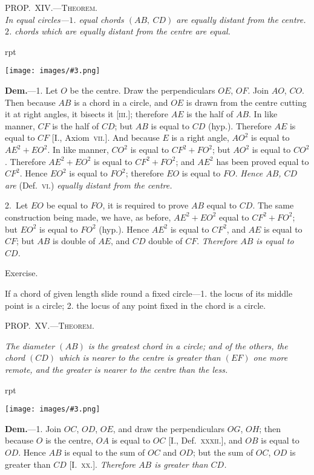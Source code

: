 \documentclass[oneside]{book}
\newcounter{wrapwidth}
\newcommand\myprop[2]{
\bigskip\Needspace*{4\baselineskip}\begin{center}\textsc{#1}\\\medskip\emph{#2}\par\end{center}
}
\newcommand\mypropl[2]{
\bigskip\Needspace*{4\baselineskip}\begin{center}\textsc{#1}\end{center}
\hspace{\parindent}\emph{#2}\par\medskip
}
\newcommand\exhead[1]{
\Needspace*{5\baselineskip}\begin{center}
\textsf{#1}
\end{center}
}
\newcommand\imgflow[3]{
\setcounter{wrapwidth}{#1}
\begin{wrapfigure}[#2]{r}{\value{wrapwidth}pt}
\begin{center}
\vspace{-0.3in}
\texttt{[image: images/\#3.png]}
\end{center}
\end{wrapfigure}
}
\begin{document}
\myprop{PROP\@.~XIV\@.---Theorem.}{In equal circles---$1$. equal chords $(AB,\ CD)$ are equally
distant from the centre. $2$. chords which are equally
distant from the centre are equal.}

\imgflow{108}{10}{f119}

\textbf{Dem.}---1. Let $O$ be the centre. Draw the perpendiculars
$OE$, $OF$. Join $AO$, $CO$.
Then because $AB$ is a chord in a
circle, and $OE$ is drawn from the
centre cutting it at right angles,
it bisects it [\textsc{iii.}]; therefore $AE$
is the half of $AB$. In like manner,
$CF$ is the half of $CD$; but $AB$
is equal to $CD$ (hyp.). Therefore
$AE$ is equal to $CF$ [I., Axiom~\textsc{vii.}].
And because $E$ is a right angle, $AO^{2}$ is equal to $AE^{2}
+ EO^{2}$. In like manner, $CO^{2}$ is equal to $CF^{2} + FO^{2}$;
but $AO^{2}$ is equal to $CO^{2}$. Therefore $AE^{2} + EO^{2}$ is
equal to $CF^{2} + FO^{2}$; and $AE^{2}$ has been proved equal to
$CF^{2}$. Hence $EO^{2}$ is equal to $FO^{2}$; therefore $EO$ is
equal to $FO$. \textit{Hence $AB$, $CD$ are} (Def.~\textsc{vi.}) \textit{equally
distant from the centre.}

2.~Let $EO$ be equal to $FO$, it is required to prove $AB$
equal to $CD$. The same construction being made, we
have, as before, $AE^{2} + EO^{2}$ equal to $CF^{2} + FO^{2}$; but $EO^{2}$
is equal to $FO^{2}$ (hyp.). Hence $AE^{2}$ is equal to $CF^{2}$,
and $AE$ is equal to $CF$; but $AB$ is double of $AE$, and
$CD$ double of $CF$. \emph{Therefore $AB$ is equal to $CD$.}

\exhead{Exercise.}

\begin{footnotesize}
If a chord of given length slide round a fixed circle---1. the
locus of its middle point is a circle; 2. the locus of any point
fixed in the chord is a circle.
\par\end{footnotesize}

\mypropl{PROP\@.~XV\@.---Theorem.}{The diameter $(AB)$ is the greatest chord in a circle;
and of the others, the chord $(CD)$ which is nearer to
the centre is greater than $(EF)$ one more remote, and
the greater is nearer to the centre than the less.}

\imgflow{120}{9}{f120}

\textbf{Dem.}---1. Join $OC$, $OD$, $OE$, and draw the perpendiculars
$OG$, $OH$; then because
$O$ is the centre, $OA$ is equal to
$OC$ [I., Def.~\textsc{xxxii.}]\label{Idefxxii}, and $OB$ is
equal to $OD$. Hence $AB$ is equal
to the sum of $OC$ and $OD$; but
the sum of $OC$, $OD$ is greater
than $CD$ [I.~\textsc{xx.}]. \emph{Therefore $AB$
is greater than $CD$.}
\end{document}
